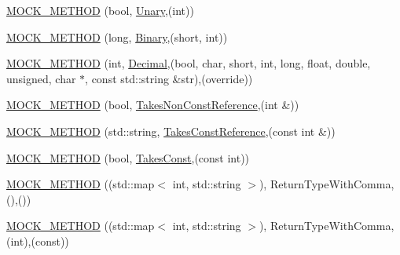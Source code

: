 \begin{DoxyCompactItemize}
\item 
\mbox{\hyperlink{classtesting_1_1gmock__function__mocker__test_1_1_mock_foo_a96c4dd29a859254e057513027a3315c8}{M\+O\+C\+K\+\_\+\+M\+E\+T\+H\+OD}} (bool, \mbox{\hyperlink{classtesting_1_1gmock__function__mocker__test_1_1_foo_interface_a6f28f91c92b59da029ed0cb61c3d1da6}{Unary}},(int))
\item 
\mbox{\hyperlink{classtesting_1_1gmock__function__mocker__test_1_1_mock_foo_a9d6597b94797dfeb1061ad7a48bbc141}{M\+O\+C\+K\+\_\+\+M\+E\+T\+H\+OD}} (long, \mbox{\hyperlink{classtesting_1_1gmock__function__mocker__test_1_1_foo_interface_a8d6e54401a3addca464903257529ace4}{Binary}},(short, int))
\item 
\mbox{\hyperlink{classtesting_1_1gmock__function__mocker__test_1_1_mock_foo_ab6783427c5fb99f8a9c25fba9210c748}{M\+O\+C\+K\+\_\+\+M\+E\+T\+H\+OD}} (int, \mbox{\hyperlink{classtesting_1_1gmock__function__mocker__test_1_1_foo_interface_a2a415a61b9a9c7a69bba9a4b5ef2a63e}{Decimal}},(bool, char, short, int, long, float, double, unsigned, char $\ast$, const std\+::string \&str),(override))
\item 
\mbox{\hyperlink{classtesting_1_1gmock__function__mocker__test_1_1_mock_foo_a50aeadd7e413ca2a8ba4507b21d4b345}{M\+O\+C\+K\+\_\+\+M\+E\+T\+H\+OD}} (bool, \mbox{\hyperlink{classtesting_1_1gmock__function__mocker__test_1_1_foo_interface_aaf21cef138ffa4a8f2372c7fbed95b18}{Takes\+Non\+Const\+Reference}},(int \&))
\item 
\mbox{\hyperlink{classtesting_1_1gmock__function__mocker__test_1_1_mock_foo_a8449bdfea3eaf9fabb34fa694c17ab25}{M\+O\+C\+K\+\_\+\+M\+E\+T\+H\+OD}} (std\+::string, \mbox{\hyperlink{classtesting_1_1gmock__function__mocker__test_1_1_foo_interface_a4765c543c11b5d544a35f9fe8de758bd}{Takes\+Const\+Reference}},(const int \&))
\item 
\mbox{\hyperlink{classtesting_1_1gmock__function__mocker__test_1_1_mock_foo_a68193fcc8b336763c92cb1c8fd7a97ea}{M\+O\+C\+K\+\_\+\+M\+E\+T\+H\+OD}} (bool, \mbox{\hyperlink{classtesting_1_1gmock__function__mocker__test_1_1_foo_interface_abb43737fd2eeb7599b6f0af540890f50}{Takes\+Const}},(const int))
\item 
\mbox{\hyperlink{classtesting_1_1gmock__function__mocker__test_1_1_mock_foo_a8fdcae66e6f4efa07a57580235ca3323}{M\+O\+C\+K\+\_\+\+M\+E\+T\+H\+OD}} ((std\+::map$<$ int, std\+::string $>$), Return\+Type\+With\+Comma,(),())
\item 
\mbox{\hyperlink{classtesting_1_1gmock__function__mocker__test_1_1_mock_foo_adfb6a040264fc42059f0b47e3f21e2df}{M\+O\+C\+K\+\_\+\+M\+E\+T\+H\+OD}} ((std\+::map$<$ int, std\+::string $>$), Return\+Type\+With\+Comma,(int),(const))

\end{DoxyCompactItemize}
